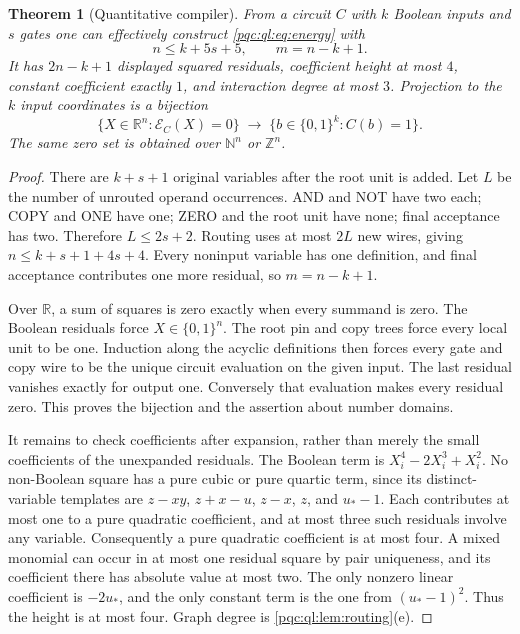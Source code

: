\documentclass[11pt,letterpaper]{article}
\numberwithin{equation}{section}
\newtheorem{theorem}{Theorem}[section]
\theoremstyle{definition}
\theoremstyle{remark}
\newcommand{\N}{\mathbb N}
\newcommand{\Z}{\mathbb Z}
\newcommand{\R}{\mathbb R}
\newcommand{\Bit}{\{0,1\}}
\newcommand{\cE}{\mathcal E}
\begin{document}
\begin{theorem}[Quantitative compiler]\label{pqc:ql:thm:compiler}
From a circuit $C$ with $k$ Boolean inputs and $s$ gates one can effectively
construct \eqref{pqc:ql:eq:energy} with
\begin{equation}\label{pqc:ql:eq:sizes}
 n\le k+5s+5,\qquad m=n-k+1.
\end{equation}
It has $2n-k+1$ displayed squared residuals, coefficient height at most $4$,
constant coefficient exactly $1$, and interaction degree at most $3$.
Projection to the $k$ input coordinates is a bijection
\begin{equation}\label{pqc:ql:eq:bijection}
 \{X\in\R^n:\cE_C(X)=0\}
 \;\longrightarrow\; \{b\in\Bit^k:C(b)=1\}.
\end{equation}
The same zero set is obtained over $\N^n$ or $\Z^n$.
\end{theorem}
\begin{proof}
There are $k+s+1$ original variables after the root unit is added. Let $L$ be
the number of unrouted operand occurrences. AND and NOT have two each;
COPY and ONE have one; ZERO and the root unit have none; final acceptance
has two. Therefore $L\le2s+2$. Routing uses at most $2L$ new wires, giving
$n\le k+s+1+4s+4$. Every noninput variable has one definition, and final
acceptance contributes one more residual, so $m=n-k+1$.

Over $\R$, a sum of squares is zero exactly when every summand is zero.
The Boolean residuals force $X\in\Bit^n$. The root pin and copy trees
force every local unit to be one. Induction along the acyclic definitions
then forces every gate and copy wire to be the unique circuit evaluation
on the given input. The last residual vanishes exactly for output one.
Conversely that evaluation makes every residual zero. This proves the
bijection and the assertion about number domains.

It remains to check coefficients after expansion, rather than merely the
small coefficients of the unexpanded residuals. The Boolean term is
$X_i^4-2X_i^3+X_i^2$. No non-Boolean square has a pure cubic or pure quartic
term, since its distinct-variable templates are $z-xy$, $z+x-u$, $z-x$,
$z$, and $u_*-1$. Each contributes at most one to a pure quadratic
coefficient, and at most three such residuals involve any variable.
Consequently a pure quadratic coefficient is at most four. A mixed
monomial can occur in at most one residual square by pair uniqueness, and
its coefficient there has absolute value at most two. The only nonzero
linear coefficient is $-2u_*$, and the only constant term is the one from
$(u_*-1)^2$. Thus the height is at most four. Graph degree is
\cref{pqc:ql:lem:routing}(e).
\end{proof}
\end{document}
